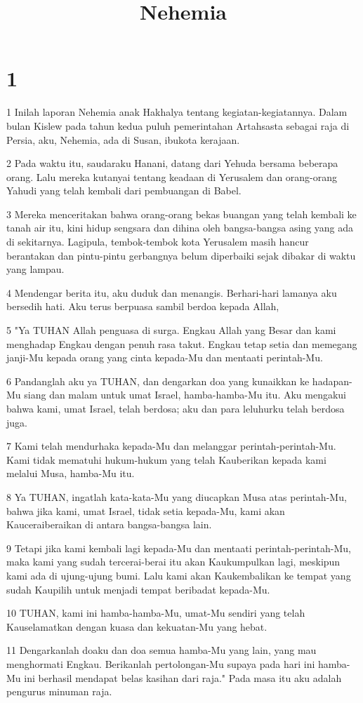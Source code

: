 

\title{Nehemia}


\chapter{1}

\par 1 Inilah laporan Nehemia anak Hakhalya tentang kegiatan-kegiatannya. Dalam bulan Kislew pada tahun kedua puluh pemerintahan Artahsasta sebagai raja di Persia, aku, Nehemia, ada di Susan, ibukota kerajaan.
\par 2 Pada waktu itu, saudaraku Hanani, datang dari Yehuda bersama beberapa orang. Lalu mereka kutanyai tentang keadaan di Yerusalem dan orang-orang Yahudi yang telah kembali dari pembuangan di Babel.
\par 3 Mereka menceritakan bahwa orang-orang bekas buangan yang telah kembali ke tanah air itu, kini hidup sengsara dan dihina oleh bangsa-bangsa asing yang ada di sekitarnya. Lagipula, tembok-tembok kota Yerusalem masih hancur berantakan dan pintu-pintu gerbangnya belum diperbaiki sejak dibakar di waktu yang lampau.
\par 4 Mendengar berita itu, aku duduk dan menangis. Berhari-hari lamanya aku bersedih hati. Aku terus berpuasa sambil berdoa kepada Allah,
\par 5 "Ya TUHAN Allah penguasa di surga. Engkau Allah yang Besar dan kami menghadap Engkau dengan penuh rasa takut. Engkau tetap setia dan memegang janji-Mu kepada orang yang cinta kepada-Mu dan mentaati perintah-Mu.
\par 6 Pandanglah aku ya TUHAN, dan dengarkan doa yang kunaikkan ke hadapan-Mu siang dan malam untuk umat Israel, hamba-hamba-Mu itu. Aku mengakui bahwa kami, umat Israel, telah berdosa; aku dan para leluhurku telah berdosa juga.
\par 7 Kami telah mendurhaka kepada-Mu dan melanggar perintah-perintah-Mu. Kami tidak mematuhi hukum-hukum yang telah Kauberikan kepada kami melalui Musa, hamba-Mu itu.
\par 8 Ya TUHAN, ingatlah kata-kata-Mu yang diucapkan Musa atas perintah-Mu, bahwa jika kami, umat Israel, tidak setia kepada-Mu, kami akan Kauceraiberaikan di antara bangsa-bangsa lain.
\par 9 Tetapi jika kami kembali lagi kepada-Mu dan mentaati perintah-perintah-Mu, maka kami yang sudah tercerai-berai itu akan Kaukumpulkan lagi, meskipun kami ada di ujung-ujung bumi. Lalu kami akan Kaukembalikan ke tempat yang sudah Kaupilih untuk menjadi tempat beribadat kepada-Mu.
\par 10 TUHAN, kami ini hamba-hamba-Mu, umat-Mu sendiri yang telah Kauselamatkan dengan kuasa dan kekuatan-Mu yang hebat.
\par 11 Dengarkanlah doaku dan doa semua hamba-Mu yang lain, yang mau menghormati Engkau. Berikanlah pertolongan-Mu supaya pada hari ini hamba-Mu ini berhasil mendapat belas kasihan dari raja." Pada masa itu aku adalah pengurus minuman raja.

